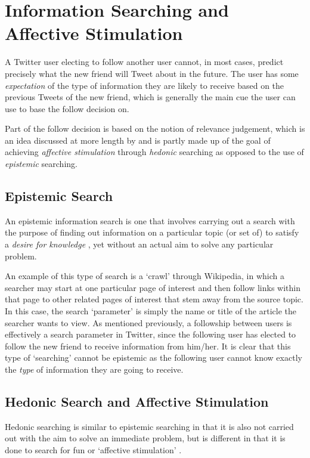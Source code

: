 \section{Information Searching and Affective Stimulation}
A Twitter user electing to follow another user cannot, in most cases, predict precisely what the new friend will Tweet about in the future. The user has some \textit{expectation} of the type of information they are likely to receive based on the previous Tweets of the new friend, which is generally the main cue the user can use to base the follow decision on.

Part of the follow decision is based on the notion of relevance judgement, which is an idea discussed at more length by \cite{xu07} and is partly made up of the goal of achieving \textit{affective stimulation} through \textit{hedonic} searching as opposed to the use of \textit{epistemic} searching.

\subsection{Epistemic Search}
An epistemic information search is one that involves carrying out a search with the purpose of finding out information on a particular topic (or set of) to satisfy a \textit{desire for knowledge} \cite{xu07}, yet without an actual aim to solve any particular problem.

An example of this type of search is a `crawl' through Wikipedia, in which a searcher may start at one particular page of interest and then follow links within that page to other related pages of interest that stem away from the source topic. In this case, the search `parameter' is simply the name or title of the article the searcher wants to view. As mentioned previously, a followship between users is effectively a search parameter in Twitter, since the following user has elected to follow the new friend to receive information from him/her. It is clear that this type of `searching' cannot be epistemic as the following user cannot know exactly the \textit{type} of information they are going to receive.

\subsection{Hedonic Search and Affective Stimulation}
\label{section:affective_stimulation}
Hedonic searching is similar to epistemic searching in that it is also not carried out with the aim to solve an immediate problem, but is different in that it is done to search for fun or `affective stimulation' \cite{xu07}.

